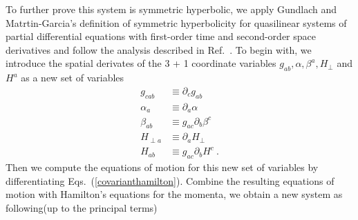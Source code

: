 To further prove this system is symmetric hyperbolic, we apply Gundlach and Matrtin-Garcia\cite{Gundlach:2005ta}'s definition of symmetric hyperbolicity for quasilinear systems of partial differential equations with first-order time and second-order space derivatives and follow the analysis described in Ref.~\cite{Brown:2011qg}. To begin with, we introduce the spatial derivates of the 3 + 1 coordinate variables $g_{ab}, \alpha, \beta^{a}, H_{\perp}$ and $H^{a}$ as a new set of variables
\begin{subequations}
\begin{align}
g_{cab} & \equiv \partial_{c}g_{ab}\\
\alpha_{a} & \equiv \partial_{a}\alpha\\
\beta_{ab} & \equiv g_{ac}\partial_{b}\beta^{c}\\
H_{\perp a} & \equiv \partial_{a}H_{\perp}\\
H_{ab} & \equiv g_{ac}\partial_{b}H^{c} \ .
\end{align}
\end{subequations}
Then we compute the equations of motion for this new set of variables by differentiating Eqs.~(\ref{covarianthamilton}). Combine the resulting equations of motion with Hamilton's equations for the momenta, we obtain a new system as following(up to the principal terms)

